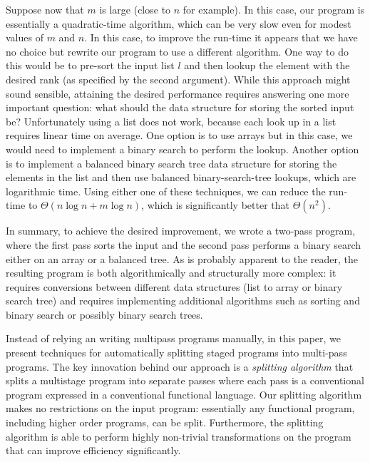 \begin{abstrsyn}
Suppose now that $m$ is large (close to $n$ for example).  In this
case, our program is essentially a quadratic-time algorithm, which can
be very slow even for modest values of $m$ and $n$. In this case, to
improve the run-time it appears that we have no choice but rewrite our
program to use a different algorithm.  One way to do this would be to
pre-sort the input list $l$ and then lookup the element with the
desired rank (as specified by the second argument).  While this
approach might sound sensible, attaining the desired performance
requires answering one more important question: what should the data
structure for storing the sorted input be?  Unfortunately using a list
does not work, because each look up in a list requires linear time on
average. One option is to use arrays but in this case, we would need
to implement a binary search to perform the lookup.  Another option is
to implement a balanced binary search tree data structure for storing
the elements in the list and then use balanced binary-search-tree
lookups, which are logarithmic time.  Using either one of these
techniques, we can reduce the run-time to $\Theta(n\log{n} + m\log{n})$,
which is significantly better that $\Theta(n^2)$.


In summary, to achieve the desired improvement, we wrote a two-pass
program, where the first pass sorts the input and the second pass
performs a binary search either on an array or a balanced tree. As is
probably apparent to the reader, the resulting program is both
algorithmically and structurally more complex: it requires conversions
between different data structures (list to array or binary search
tree) and requires implementing additional algorithms such as sorting
and binary search or possibly binary search trees.  



Instead of relying an writing multipass programs manually, in this
paper, we present techniques for automatically splitting staged
programs into multi-pass programs.  The key innovation behind our
approach is a {\em splitting algorithm} that splits a multistage
program into separate passes where each pass is a conventional program
expressed in a conventional functional language.  Our splitting
algorithm makes no restrictions on the input program: essentially any
functional program, including higher order programs, can be split.
Furthermore, the splitting algorithm is able to perform highly
non-trivial transformations on the program that can improve efficiency
significantly. 


\end{abstrsyn}

